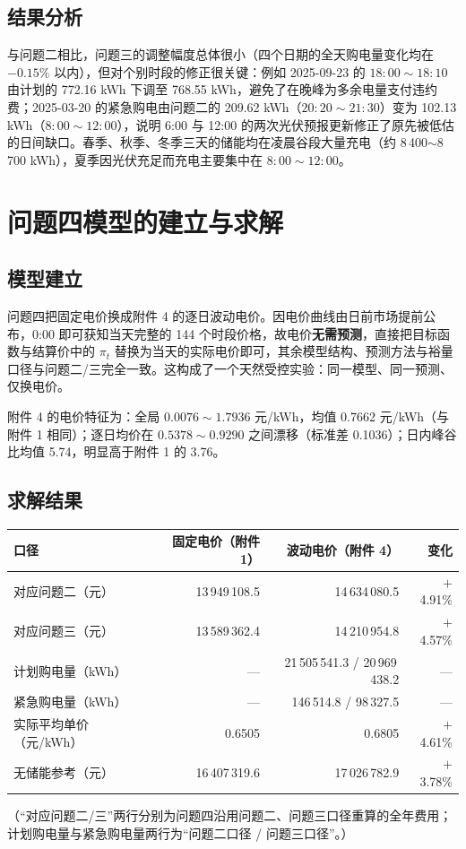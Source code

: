 \documentclass{cumcmthesis}
\begin{document}
\subsection{结果分析}
与问题二相比，问题三的调整幅度总体很小（四个日期的全天购电量变化均在 $-0.15\%$ 以内），但对个别时段的修正很关键：例如 2025-09-23 的 $18{:}00\sim18{:}10$ 由计划的 772.16 kWh 下调至 768.55 kWh，避免了在晚峰为多余电量支付违约费；2025-03-20 的紧急购电由问题二的 209.62 kWh（$20{:}20\sim21{:}30$）变为 102.13 kWh（$8{:}00\sim12{:}00$），说明 6:00 与 12:00 的两次光伏预报更新修正了原先被低估的日间缺口。春季、秋季、冬季三天的储能均在凌晨谷段大量充电（约 8\,400$\sim$8\,700 kWh），夏季因光伏充足而充电主要集中在 $8{:}00\sim12{:}00$。

\section{问题四模型的建立与求解}
\subsection{模型建立}
问题四把固定电价换成附件 4 的逐日波动电价。因电价曲线由日前市场提前公布，0:00 即可获知当天完整的 144 个时段价格，故电价\textbf{无需预测}，直接把目标函数与结算价中的 $\pi_t$ 替换为当天的实际电价即可，其余模型结构、预测方法与裕量口径与问题二/三完全一致。这构成了一个天然受控实验：同一模型、同一预测、仅换电价。

附件 4 的电价特征为：全局 $0.0076\sim1.7936$ 元/kWh，均值 0.7662 元/kWh（与附件 1 相同）；逐日均价在 $0.5378\sim0.9290$ 之间漂移（标准差 0.1036）；日内峰谷比均值 5.74，明显高于附件 1 的 3.76。

\subsection{求解结果}
\begin{center}
\small
\begin{tabular}{lrrr}
\hline
口径 & 固定电价（附件 1） & 波动电价（附件 4） & 变化 \\
\hline
对应问题二（元） & 13\,949\,108.5 & 14\,634\,080.5 & $+$4.91\% \\
对应问题三（元） & 13\,589\,362.4 & 14\,210\,954.8 & $+$4.57\% \\
计划购电量（kWh） & --- & 21\,505\,541.3 / 20\,969\,438.2 & --- \\
紧急购电量（kWh） & --- & 146\,514.8 / 98\,327.5 & --- \\
实际平均单价（元/kWh） & 0.6505 & 0.6805 & $+$4.61\% \\
无储能参考（元） & 16\,407\,319.6 & 17\,026\,782.9 & $+$3.78\% \\
\hline
\end{tabular}
\end{center}
（“对应问题二/三”两行分别为问题四沿用问题二、问题三口径重算的全年费用；计划购电量与紧急购电量两行为“问题二口径 / 问题三口径”。）
\end{document}
